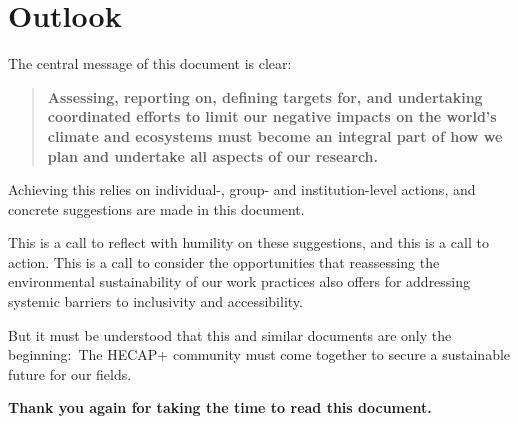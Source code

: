 \documentclass[../SustainableHEP.tex]{subfiles}
\begin{document}
\RaggedRight
\sloppy
\newpage


\section{Outlook}
\label{sec:Outlook}

The central message of this document is clear:
\begin{quotation}
{\bfseries Assessing, reporting on, defining targets for, and undertaking coordinated efforts to limit our negative impacts on the world's climate and ecosystems must become an integral part of how we plan and undertake all aspects of our research.}
\end{quotation}
Achieving this relies on individual-, group- and institution-level actions, and concrete suggestions are made in this document.

This is a call to reflect with humility on these suggestions, and this is a call to action. This is a call to consider the opportunities that reassessing the environmental sustainability of our work practices also offers for addressing systemic barriers to inclusivity and accessibility.

But it must be understood that this and similar documents are only the beginning:\ The HECAP+ community must come together to secure a sustainable future for our fields.

\noindent \textbf{Thank you again for taking the time to read this document.}
\end{document}
